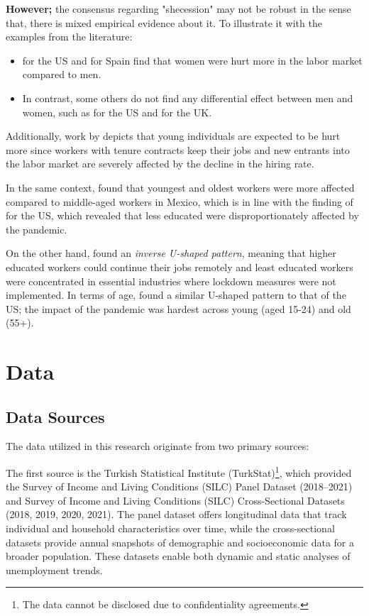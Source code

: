 \documentclass[a4paper,12pt]{article}
\begin{document}
\indent \textbf{However;} the consensus regarding "shecession" may not be robust in the sense that, there is mixed empirical evidence about it. To illustrate it with the examples from the literature:
\begin{itemize}
    \item \textbf{\cite{cortes2020}} for the US and \textbf{\cite{farre2020}} for Spain find that women were hurt more in the labor market compared to men.
    \item In contrast, some others do not find any differential effect between men and women, such as \textbf{\cite{milovanska2021}} for the US and \textbf{\cite{petrongolo2020}} for the UK.

\end{itemize}

Additionally, work by \textbf{\cite{crossley2020}} depicts that young individuals are expected to be hurt more since workers with tenure contracts keep their jobs and new entrants into the labor market are severely affected by the decline in the hiring rate.

In the same context, \textbf{\cite{hoehnvvelasco2021}} found that youngest and oldest workers were more affected compared to middle-aged workers in Mexico, which is in line with the finding of \textbf{\cite{cortes2020}} for the US, which revealed that less educated were disproportionately affected by the pandemic.

\indent On the other hand, \textbf{\cite{montenovo2020}} found an \textit{inverse U-shaped pattern}, meaning that higher educated workers could continue their jobs remotely and least educated workers were concentrated in essential industries where lockdown measures were not implemented. In terms of age, \textbf{\cite{aldan2021}} found a similar U-shaped pattern to that of the US; the impact of the pandemic was hardest across young (aged 15-24) and old (55+).


\section{Data}
\label{sec:data}
\subsection{Data Sources}

The data utilized in this research originate from two primary sources:

The first source is the Turkish Statistical Institute (TurkStat)\footnote{The data cannot be disclosed due to confidentiality agreements.}, which provided the Survey of Income and Living Conditions (SILC) Panel Dataset (2018--2021) and Survey of Income and Living Conditions (SILC) Cross-Sectional Datasets (2018, 2019, 2020, 2021). The panel dataset offers longitudinal data that track individual and household characteristics over time, while the cross-sectional datasets provide annual snapshots of demographic and socioeconomic data for a broader population. These datasets enable both dynamic and static analyses of unemployment trends.
\end{document}
